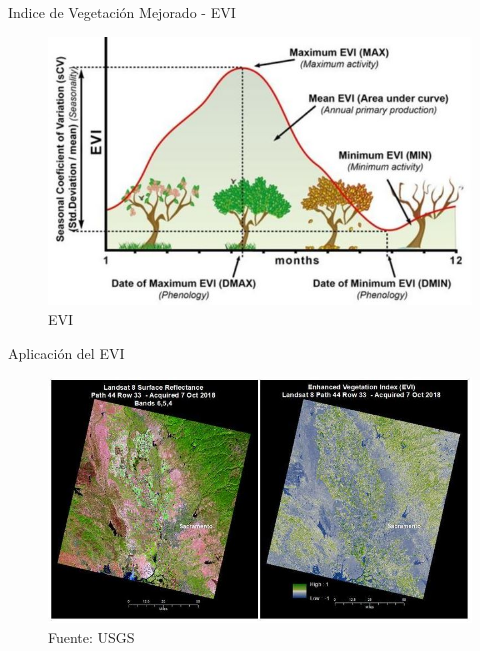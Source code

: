 \begin{frame}{Indice de Vegetación Mejorado - EVI}
	\begin{figure}
		\includegraphics[scale=0.55]{imgs/EVI.JPG}
		\caption{EVI}
	\end{figure}
\end{frame}

\begin{frame}{Aplicación del EVI}
	\begin{figure}
		\includegraphics[scale=0.5]{imgs/EVI_result.JPG}
		\caption{Fuente: USGS}
	\end{figure}
\end{frame}


